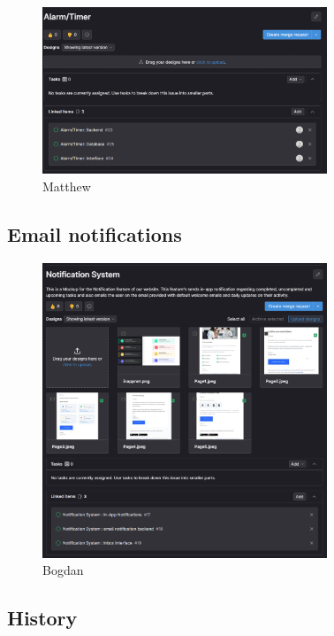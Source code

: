 \documentclass[a4paper]{article}
\begin{document}
\begin{figure}[H] %
	\centering %
	\includegraphics[width=0.76\textwidth]{./images/S2_Alarm.png}
	\caption*{Matthew} %
	\label{Fig.S2_Alarm} %
\end{figure}

\subsection{Email notifications}

\begin{figure}[H] %
	\centering %
	\includegraphics[width=0.76\textwidth]{./images/S2_Email.png}
	\caption*{Bogdan} %
	\label{Fig.S2_Email} %
\end{figure}

\subsection{History}
\end{document}
